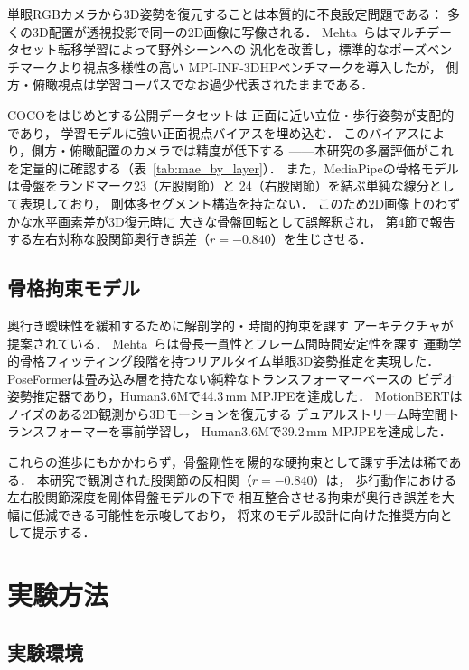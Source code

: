 \documentclass[twocolumn]{article}
\begin{document}
単眼RGBカメラから3D姿勢を復元することは本質的に不良設定問題である：
多くの3D配置が透視投影で同一の2D画像に写像される．
Mehta~ら\cite{mehta2017}はマルチデータセット転移学習によって野外シーンへの
汎化を改善し，標準的なポーズベンチマークより視点多様性の高い
MPI-INF-3DHPベンチマークを導入したが，
側方・俯瞰視点は学習コーパスでなお過少代表されたままである．

COCO\cite{coco}をはじめとする公開データセットは
正面に近い立位・歩行姿勢が支配的であり，
学習モデルに強い正面視点バイアスを埋め込む．
このバイアスにより，側方・俯瞰配置のカメラでは精度が低下する
——本研究の多層評価がこれを定量的に確認する（表~\ref{tab:mae_by_layer}）．
また，MediaPipeの骨格モデルは骨盤をランドマーク23（左股関節）と
24（右股関節）を結ぶ単純な線分として表現しており，
剛体多セグメント構造を持たない．
このため2D画像上のわずかな水平画素差が3D復元時に
大きな骨盤回転として誤解釈され，
第4節で報告する左右対称な股関節奥行き誤差（$r=-0.840$）を生じさせる．

\subsection{骨格拘束モデル}

奥行き曖昧性を緩和するために解剖学的・時間的拘束を課す
アーキテクチャが提案されている．
Mehta~ら\cite{vnect}は骨長一貫性とフレーム間時間安定性を課す
運動学的骨格フィッティング段階を持つリアルタイム単眼3D姿勢推定を実現した．
PoseFormer\cite{poseformer}は畳み込み層を持たない純粋なトランスフォーマーベースの
ビデオ姿勢推定器であり，Human3.6Mで44.3\,mm MPJPEを達成した．
MotionBERT\cite{motionbert}はノイズのある2D観測から3Dモーションを復元する
デュアルストリーム時空間トランスフォーマーを事前学習し，
Human3.6Mで39.2\,mm MPJPEを達成した．

これらの進歩にもかかわらず，骨盤剛性を陽的な硬拘束として課す手法は稀である．
本研究で観測された股関節の反相関（$r=-0.840$）は，
歩行動作における左右股関節深度を剛体骨盤モデルの下で
相互整合させる拘束が奥行き誤差を大幅に低減できる可能性を示唆しており，
将来のモデル設計に向けた推奨方向として提示する．

\section{実験方法}

\subsection{実験環境}
\end{document}
